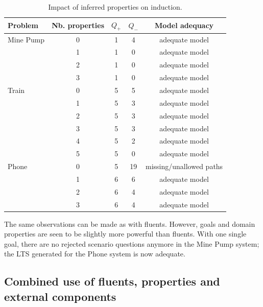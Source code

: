 \begin{table}
\centering
\begin{tabular}{|l||c||c|c|c|}\hline
Problem   & Nb. properties &$Q_+$&$Q_-$& Model adequacy\\\hline\hline
Mine Pump & 0              & 1   & 4   & adequate model\\\cline{2-5}
          & 1              & 1   & 0   & adequate model\\\cline{2-5}
          & 2              & 1   & 0   & adequate model\\\cline{2-5}
          & 3              & 1   & 0   & adequate model\\\hline\hline
Train     & 0              & 5   & 5   & adequate model\\\cline{2-5}
          & 1              & 5   & 3   & adequate model\\\cline{2-5}
          & 2              & 5   & 3   & adequate model\\\cline{2-5}
          & 3              & 5   & 3   & adequate model\\\cline{2-5}
          & 4              & 5   & 2   & adequate model\\\cline{2-5}
          & 5              & 5   & 0   & adequate model\\\hline\hline
Phone     & 0              & 5   & 19  & missing/unallowed paths\\\cline{2-5}
          & 1              & 6   & 6   & adequate model\\\cline{2-5}
          & 2              & 6   & 4   & adequate model\\\cline{2-5}
          & 3              & 6   & 4   & adequate model\\\hline
\end{tabular}
\caption{Impact of inferred properties on induction.\label{Properties:res}}
\end{table}

The same observations can be made as with fluents. However, goals and domain properties are seen to be slightly more powerful than fluents. With one single goal, there are no rejected scenario questions anymore in the Mine Pump system; the LTS generated for the Phone system is now adequate.


\subsection{Combined use of fluents, properties and external components}

